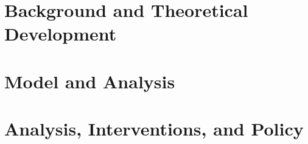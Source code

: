

\part{Background and Theoretical Development} \label{part-background}





\part{Model and Analysis} \label{part-model}



\part{Analysis, Interventions, and Policy} \label{part-system}


